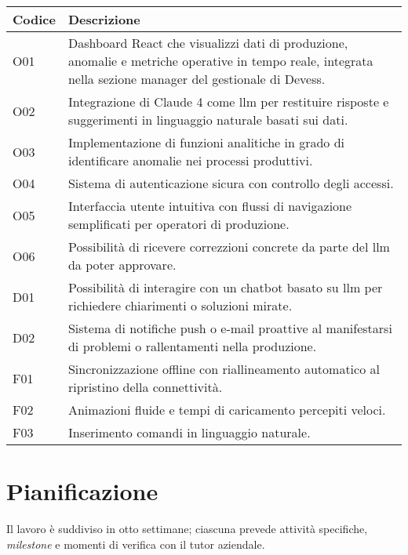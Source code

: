 \begin{center}
\brandTableColors
\begin{longtable}{|p{2.25cm}|p{12.00cm}|}
  \hline
  \textbf{Codice} & \textbf{Descrizione} \\ \hline
  \endhead
  \rowcolors{1}{tableRowA}{tableRowB}

  O01 & Dashboard React che visualizzi dati di produzione, anomalie e metriche operative in tempo reale, integrata nella sezione manager del gestionale di Devess. \\ \hline
  O02 & Integrazione di Claude 4 come \gls{llm} per restituire risposte e suggerimenti in linguaggio naturale basati sui dati. \\ \hline
  O03 & Implementazione di funzioni analitiche in grado di identificare anomalie nei processi produttivi. \\ \hline
  O04 & Sistema di autenticazione sicura con controllo degli accessi. \\ \hline
  O05 & Interfaccia utente intuitiva con flussi di navigazione semplificati per operatori di produzione. \\ \hline
  O06 & Possibilità di ricevere correzzioni concrete da parte del \gls{llm} da poter approvare. \\ \hline
  D01 & Possibilità di interagire con un chatbot basato su \gls{llm} per richiedere chiarimenti o soluzioni mirate. \\ \hline
  D02 & Sistema di notifiche push o e-mail proattive al manifestarsi di problemi o rallentamenti nella produzione. \\ \hline
  F01 & Sincronizzazione offline con riallineamento automatico al ripristino della connettività. \\ \hline
  F02 & Animazioni fluide e tempi di caricamento percepiti veloci. \\ \hline
  F03 & Inserimento comandi in linguaggio naturale. \\ \hline
\end{longtable}
\label{tab:requisiti_obbiettivi}
\end{center}



\section{Pianificazione}
\label{subsec:pianificazione}

Il lavoro è suddiviso in otto settimane; ciascuna prevede attività specifiche, \textit{milestone} e momenti di verifica con il tutor aziendale.

